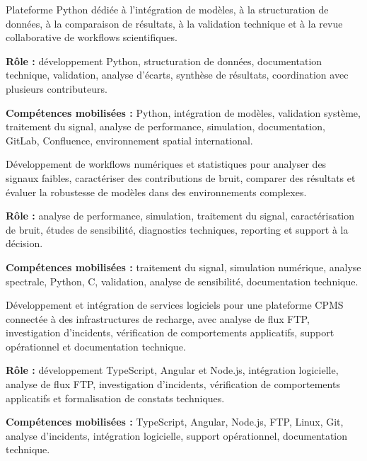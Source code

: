 \documentclass[8pt,a4paper,ragged2e,withhyper]{altacv}
\begin{document}
Plateforme Python dédiée à l’intégration de modèles, à la structuration de données, à la comparaison de résultats, à la validation technique et à la revue collaborative de workflows scientifiques.

\textbf{Rôle :} développement Python, structuration de données, documentation technique, validation, analyse d’écarts, synthèse de résultats, coordination avec plusieurs contributeurs.

\textbf{Compétences mobilisées :} Python, intégration de modèles, validation système, traitement du signal, analyse de performance, simulation, documentation, GitLab, Confluence, environnement spatial international.

\divider


Développement de workflows numériques et statistiques pour analyser des signaux faibles, caractériser des contributions de bruit, comparer des résultats et évaluer la robustesse de modèles dans des environnements complexes.

\textbf{Rôle :} analyse de performance, simulation, traitement du signal, caractérisation de bruit, études de sensibilité, diagnostics techniques, reporting et support à la décision.

\textbf{Compétences mobilisées :} traitement du signal, simulation numérique, analyse spectrale, Python, C, validation, analyse de sensibilité, documentation technique.

\divider


Développement et intégration de services logiciels pour une plateforme CPMS connectée à des infrastructures de recharge, avec analyse de flux FTP, investigation d’incidents, vérification de comportements applicatifs, support opérationnel et documentation technique.

\textbf{Rôle :} développement TypeScript, Angular et Node.js, intégration logicielle, analyse de flux FTP, investigation d’incidents, vérification de comportements applicatifs et formalisation de constats techniques.

\textbf{Compétences mobilisées :} TypeScript, Angular, Node.js, FTP, Linux, Git, analyse d’incidents, intégration logicielle, support opérationnel, documentation technique.
\end{document}
